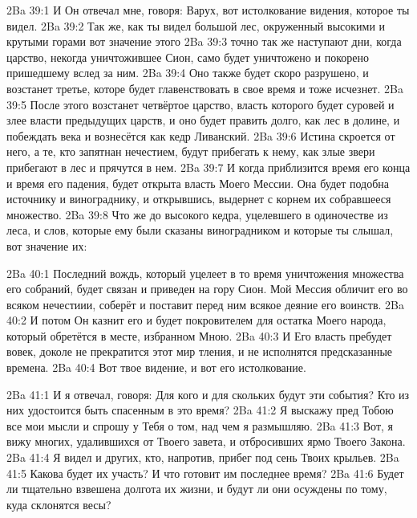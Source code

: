\vs 2Ba 39:1
И Он отвечал мне, говоря: Варух, вот истолкование видения, которое ты видел.
\vs 2Ba 39:2
Так же, как ты видел большой лес, окруженный высокими и крутыми горами вот значение этого
\vs 2Ba 39:3
точно так же наступают дни, когда царство, некогда уничтожившее Сион, само будет уничтожено и покорено пришедшему вслед за ним.
\vs 2Ba 39:4
Оно также будет скоро разрушено, и возстанет третье, которе будет главенствовать в свое время и тоже исчезнет.
\vs 2Ba 39:5
После этого возстанет четвёртое царство, власть которого будет суровей и злее власти предыдущих царств, и оно будет править долго, как лес в долине, и побеждать века и вознесётся как кедр Ливанский.
\vs 2Ba 39:6
Истина скроется от него, а те, кто запятнан нечестием, будут прибегать к нему, как злые звери прибегают в лес и прячутся в нем.
\vs 2Ba 39:7
И когда приблизится время его конца и время его падения, будет открыта власть Моего Мессии. Она будет подобна источнику и винограднику, и открывшись, выдернет с корнем их собравшееся множество.
\vs 2Ba 39:8
Что же до высокого кедра, уцелевшего в одиночестве из леса, и слов, которые ему были сказаны виноградником и которые ты слышал, вот значение их:

\vs 2Ba 40:1
Последний вождь, который уцелеет в то время уничтожения множества его собраний, будет связан и приведен на гору Сион. Мой Мессия обличит его во всяком нечестиии, соберёт и поставит перед ним всякое деяние его воинств.
\vs 2Ba 40:2
И потом Он казнит его и будет покровителем для остатка Моего народа, который обретётся в месте, избранном Мною.
\vs 2Ba 40:3
И Его власть пребудет вовек, доколе не прекратится этот мир тления, и не исполнятся предсказанные времена.
\vs 2Ba 40:4
Вот твое видение, и вот его истолкование.

\vs 2Ba 41:1
И я отвечал, говоря: Для кого и для скольких будут эти события? Кто из них удостоится быть спасенным в это время?
\vs 2Ba 41:2
Я выскажу пред Тобою все мои мысли и спрошу у Тебя о том, над чем я размышляю.
\vs 2Ba 41:3
Вот, я вижу многих, удалившихся от Твоего завета, и отбросивших ярмо Твоего Закона.
\vs 2Ba 41:4
Я видел и других, кто, напротив, прибег под сень Твоих крыльев.
\vs 2Ba 41:5
Какова будет их участь? И что готовит им последнее время?
\vs 2Ba 41:6
Будет ли тщательно взвешена долгота их жизни, и будут ли они осуждены по тому, куда склонятся весы?

